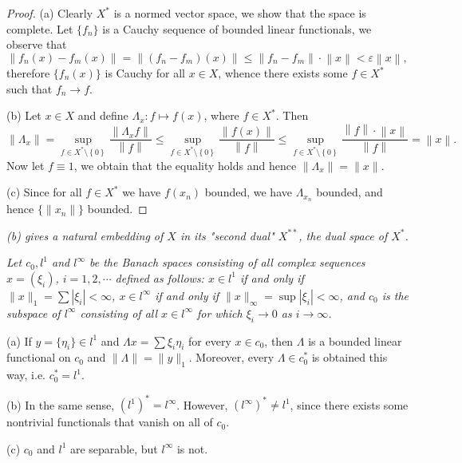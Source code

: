 \begin{proof}
(a) Clearly $X^*$ is a normed vector space, we show that the space is complete. Let $\{f_n\}$ is a Cauchy sequence of bounded linear functionals, we observe that 
$$
\left\| f_n\left( x \right) -f_m\left( x \right) \right\| =\left\| \left( f_n-f_m \right) \left( x \right) \right\| \le \left\| f_n-f_m \right\| \cdot \left\| x \right\| <\varepsilon \left\| x \right\| ,
$$
therefore $\{f_n(x)\}$ is Cauchy for all $x\in X$, whence there exists some $f\in X^*$ such that $f_n\to f$.\par
(b) Let $x\in X$ and define $\Lambda_x:f\mapsto f(x)$, where $f\in X^*$. Then 
$$
\left\| \Lambda _x \right\| =\mathop {\mathrm{sup}} \limits_{f\in X^*\setminus \left\{ 0 \right\}}\frac{\left\| \Lambda _xf \right\|}{\left\| f \right\|}\le \mathop {\mathrm{sup}} \limits_{f\in X^*\setminus \left\{ 0 \right\}}\frac{\left\| f\left( x \right) \right\|}{\left\| f \right\|}\le \mathop {\mathrm{sup}} \limits_{f\in X^*\setminus \left\{ 0 \right\}}\frac{\left\| f \right\| \cdot \left\| x \right\|}{\left\| f \right\|}=\left\| x \right\| .
$$
Now let $f\equiv 1$, we obtain that the equality holds and hence $\|\Lambda_x\|=\|x\|$.\par
(c) Since for all $f\in X^*$ we have $f(x_n)$ bounded, we have $\Lambda_{x_n}$ bounded, and hence $\{\|x_n\|\}$ bounded.
\end{proof}
\begin{note}\em
(b) gives a natural embedding of $X$ in its "second dual" $X^{**}$, the dual space of $X^*$.
\end{note}
\begin{problem}\em
Let $c_0,l^1$ and $l^\infty$ be the Banach spaces consisting of all complex sequences $x=(\xi_i)$, $i=1,2,\cdots$ defined as follows: $x\in l^1$ if and only if $\|x\|_1=\sum|\xi_i|<\infty$, $x\in l^\infty$ if and only if $\|x\|_\infty=\sup|\xi_i|<\infty$, and $c_0$ is the subspace of $l^\infty$ consisting of all $x\in l^\infty$ for which $\xi_i\to 0$ as $i\to\infty$.\par
(a) If $y=\{\eta_i\}\in l^1$ and $\Lambda x=\sum\xi_i\eta_i$ for every $x\in c_0$, then $\Lambda$ is a bounded linear functional on $c_0$ and $\|\Lambda\|=\|y\|_1$. Moreover, every $\Lambda\in c_0^*$ is obtained this way, i.e. $c_0^*=l^1$.\par
(b) In the same sense, $(l^1)^*=l^\infty$. However, $(l^\infty)^*\ne l^1$, since there exists some nontrivial functionals that vanish on all of $c_0$.\par
(c) $c_0$ and $l^1$ are separable, but $l^\infty$ is not.
\end{problem}
